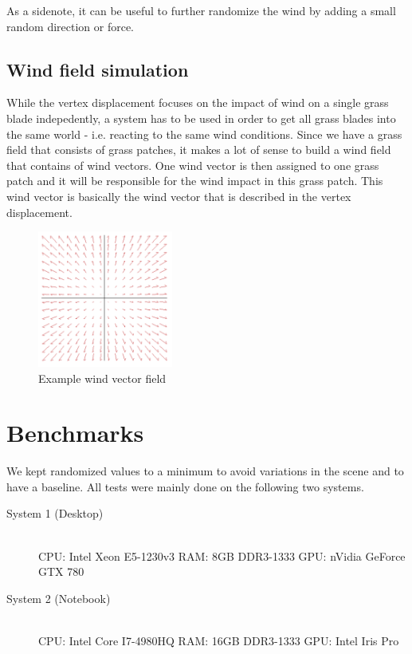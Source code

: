 \documentclass[conference]{acmsiggraph}
\begin{document}
As a sidenote, it can be useful to further randomize the wind by adding a small random direction or force.

\subsection{Wind field simulation}
While the vertex displacement focuses on the impact of wind on a single grass blade indepedently, a system has to be used in order to get all grass blades into the same world - i.e. reacting to the same wind conditions. Since we have a grass field that consists of grass patches, it makes a lot of sense to build a wind field that contains of wind vectors. One wind vector is then assigned to one grass patch and it will be responsible for the wind impact in this grass patch. This wind vector is basically the wind vector that is described in the vertex displacement.

 \begin{figure}[ht]
   \centering
   \includegraphics[width=1.75in]{images/windField}
   \caption{Example wind vector field}
 \end{figure}
 
 

\section{Benchmarks}
We kept randomized values to a minimum to avoid variations in the scene and to have a baseline. All tests were mainly done on the following two systems.

\begin{flushleft}
\begin{description}
  \item[System 1 (Desktop)] \hfill \\
  CPU: Intel Xeon E5-1230v3 \linebreak
  RAM: 8GB DDR3-1333 \linebreak
  GPU: nVidia GeForce GTX 780
  \item[System 2 (Notebook)] \hfill \\
  CPU: Intel Core I7-4980HQ \linebreak
  RAM: 16GB DDR3-1333 \linebreak
  GPU: Intel Iris Pro
\end{description}
\end{flushleft}
\end{document}
